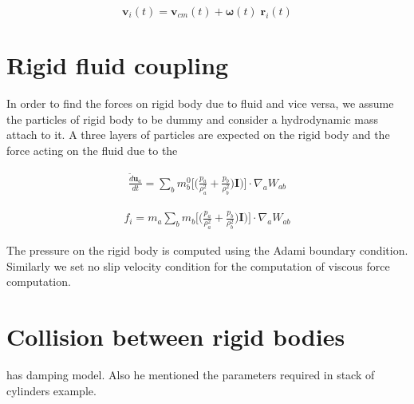 \documentclass[preprint,12pt]{elsarticle}
\newcommand{\todoin}{\todo[inline]}
\newcommand{\teng}[1]{\ensuremath{\boldsymbol{#1}}}
\newcommand{\ten}[1]{\ensuremath{\mathbf{#1}}}
\begin{document}
\begin{equation}
  \label{eq:rb_particle_vel_update}
  \ten{v}_i(t) = \ten{v}_{cm}(t) + \teng{\omega}(t) \; \ten{r}_{i}(t)
\end{equation}


\FloatBarrier%
\section{Rigid fluid coupling}
\label{sec:rfc}

In order to find the forces on rigid body due to fluid and vice versa, we
assume the particles of rigid body to be dummy and consider a hydrodynamic
mass attach to it. A three layers of particles are expected on the rigid body
and the force acting on the fluid due to the

\begin{multline}
  \label{eq:force_on_fluid_due_to_rb}
  \frac{\tilde{d}\ten{u}_{a}}{dt} =  \sum_{b} m^0_b \bigg[
  \bigg(\frac{p_a}{\rho_a^2} + \frac{p_b}{\rho_b^2}\bigg) \ten{I}\bigg) \bigg]
  \cdot \nabla_{a} W_{ab}
\end{multline}

\begin{multline}
  \label{eq:force_on_fluid_due_to_rb}
  f_i =  m_a \sum_{b} m_b \bigg[
  \bigg(\frac{p_a}{\rho_a^2} + \frac{p_b}{\rho_b^2}\bigg) \ten{I}\bigg) \bigg]
  \cdot \nabla_{a} W_{ab}
\end{multline}


The pressure on the rigid body is computed using the Adami boundary condition.
Similarly we set no slip velocity condition for the computation of viscous
force computation.


\FloatBarrier%
\section{Collision between rigid bodies}
\label{sec:contact-force}

\citet{chen2019coupled} has damping model. Also he mentioned the parameters
required in stack of cylinders example.


\end{document}
